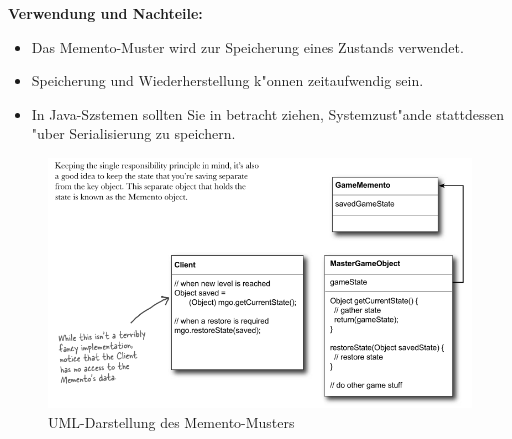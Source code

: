 \textbf{Verwendung und Nachteile:}
\begin{itemize}
	\item Das Memento-Muster wird zur Speicherung eines Zustands verwendet.
	\item Speicherung und Wiederherstellung k"onnen zeitaufwendig sein.
	\item In Java-Szstemen sollten Sie in betracht ziehen, Systemzust"ande stattdessen "uber Serialisierung zu speichern. 
\end{itemize}

\begin{figure}
	\centering
	\includegraphics[width=.9\linewidth]{memento/img/mementoUML}
	\caption{UML-Darstellung des Memento-Musters}
	\label{fig:mementoUML}
\end{figure}
